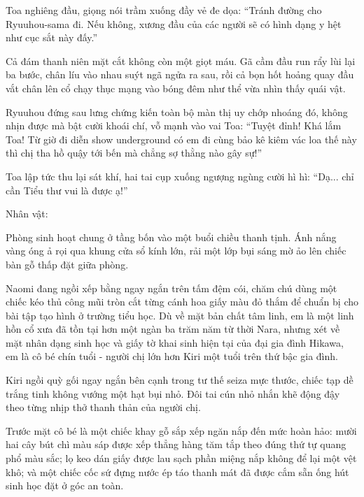 \documentclass[../main.tex]{subfiles}
\begin{document}
Toa nghiêng đầu, giọng nói trầm xuống đầy vẻ đe dọa: ``Tránh đường cho Ryuuhou-sama đi. Nếu không, xương đầu của các người sẽ có hình dạng y hệt như cục sắt này đấy.''

Cả đám thanh niên mặt cắt không còn một giọt máu. Gã cầm đầu run rẩy lùi lại ba bước, chân líu vào nhau suýt ngã ngửa ra sau, rồi cả bọn hốt hoảng quay đầu vắt chân lên cổ chạy thục mạng vào bóng đêm như thể vừa nhìn thấy quái vật.

Ryuuhou đứng sau lưng chứng kiến toàn bộ màn thị uy chớp nhoáng đó, không nhịn được mà bật cười khoái chí, vỗ mạnh vào vai Toa: ``Tuyệt đỉnh! Khá lắm Toa! Từ giờ đi diễn show underground có em đi cùng bảo kê kiêm vác loa thế này thì chị tha hồ quậy tới bến mà chẳng sợ thằng nào gây sự!''

Toa lập tức thu lại sát khí, hai tai cụp xuống ngượng ngùng cười hì hì: ``Dạ... chỉ cần Tiểu thư vui là được ạ!''

\newpage

\begin{center}
  {\caviar\fontsize{12pt}{12pt}\selectfont Nhân vật:  }
\end{center}

Phòng sinh hoạt chung ở tầng bốn vào một buổi chiều thanh tịnh. Ánh nắng vàng óng ả rọi qua khung cửa sổ kính lớn, rải một lớp bụi sáng mờ ảo lên chiếc bàn gỗ thấp đặt giữa phòng.

Naomi đang ngồi xếp bằng ngay ngắn trên tấm đệm cói, chăm chú dùng một chiếc kéo thủ công mũi tròn cắt từng cánh hoa giấy màu đỏ thắm để chuẩn bị cho bài tập tạo hình ở trường tiểu học. Dù về mặt bản chất tâm linh, em là một linh hồn cổ xưa đã tồn tại hơn một ngàn ba trăm năm từ thời Nara, nhưng xét về mặt nhân dạng sinh học và giấy tờ khai sinh hiện tại của đại gia đình Hikawa, em là cô bé chín tuổi - người chị lớn hơn Kiri một tuổi trên thứ bậc gia đình.

Kiri ngồi quỳ gối ngay ngắn bên cạnh trong tư thế seiza mực thước, chiếc tạp dề trắng tinh không vướng một hạt bụi nhỏ. Đôi tai cún nhỏ nhắn khẽ động đậy theo từng nhịp thở thanh thản của người chị.

Trước mặt cô bé là một chiếc khay gỗ sắp xếp ngăn nắp đến mức hoàn hảo: mười hai cây bút chì màu sáp được xếp thẳng hàng tăm tắp theo đúng thứ tự quang phổ màu sắc; lọ keo dán giấy được lau sạch phần miệng nắp không để lại một vệt khô; và một chiếc cốc sứ đựng nước ép táo thanh mát đã được cắm sẵn ống hút sinh học đặt ở góc an toàn.
\end{document}
